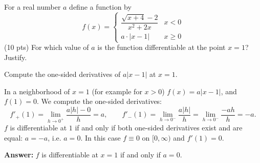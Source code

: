 
\begin{question}
For a real number $a$ define a function by
\[ f(x) = \begin{cases} \dfrac{\sqrt{x+4} - 2}{x^2 + 2x} & x < 0 \\ a\cdot|x - 1| & x \ge 0 \end{cases} \]
(10 pts) For which value of $a$ is the function differentiable at the point $x = 1$? Justify.
\end{question}

\begin{hint}
Compute the one-sided derivatives of $a|x-1|$ at $x=1$.
\end{hint}

\begin{solution}
In a neighborhood of $x = 1$ (for example for $x>0$) $f(x) = a|x - 1|$, and $f(1) = 0$. We compute the one-sided derivatives:
\[ f'_+(1) = \lim_{h\to0^+}\frac{a|h| - 0}{h} = a, \qquad f'_-(1) = \lim_{h\to0^-}\frac{a|h|}{h} = \lim_{h\to 0^-}\frac{-ah}{h} = -a. \]
$f$ is differentiable at $1$ if and only if both one-sided derivatives exist and are equal: $a = -a$, i.e. $a = 0$.
In this case $f \equiv 0$ on $[0,\infty)$ and $f'(1) = 0$.

\textbf{Answer:} $f$ is differentiable at $x=1$ if and only if $a = 0$.
\end{solution}
